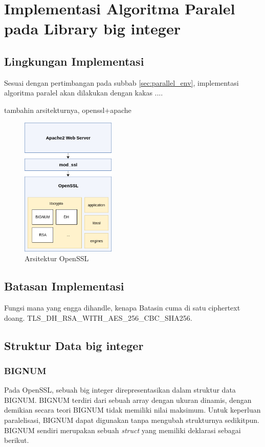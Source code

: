 
\section{Implementasi Algoritma Paralel pada Library big integer}
\subsection{Lingkungan Implementasi}
Sesuai dengan pertimbangan pada subbab \ref{sec:parallel_env}, implementasi algoritma paralel akan dilakukan dengan kakas ....

tambahin arsitekturnya, openssl+apache
\begin{figure}[h]
  \centering
  \includegraphics[width=0.4\textwidth]{resources/ch-4/implementation_arch.png}
  \caption{Arsitektur OpenSSL}
  \label{fig:openssl_arch}
\end{figure}

\subsection{Batasan Implementasi}
Fungsi mana yang engga dihandle, kenapa
Batasin cuma di satu ciphertext doang. TLS\_DH\_RSA\_WITH\_AES\_256\_CBC\_SHA256.

\subsection{Struktur Data big integer}
\subsubsection{BIGNUM}
Pada OpenSSL, sebuah big integer direpresentasikan dalam struktur data BIGNUM. BIGNUM terdiri dari sebuah array dengan ukuran dinamis, dengan demikian secara teori BIGNUM tidak memiliki nilai maksimum. Untuk keperluan paralelisasi, BIGNUM dapat digunakan tanpa mengubah strukturnya sedikitpun. BIGNUM sendiri merupakan sebuah \textit{struct} yang memiliki deklarasi sebagai berikut.

